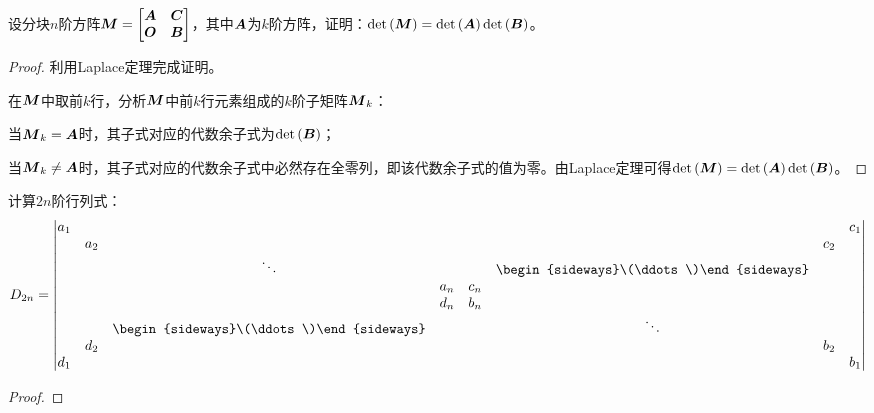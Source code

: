 \begin{problem}
设分块\(n\)阶方阵\(\boldsymbol{M}=\begin{bmatrix}\boldsymbol{A}&\boldsymbol{C}\\\boldsymbol{O}&\boldsymbol{B}\end{bmatrix}\)，其中\(\boldsymbol{A}\)为\(k\)阶方阵，证明：\(\mathrm{det}\left( \boldsymbol{M} \right)=\mathrm{det}\left( \boldsymbol{A} \right)\mathrm{det}\left( \boldsymbol{B} \right)\)。
\end{problem}
\begin{proof}
    利用Laplace定理完成证明。

    在\(\boldsymbol{M}\)中取前\(k\)行，分析\(\boldsymbol{M}\)中前\(k\)行元素组成的\(k\)阶子矩阵\(\boldsymbol{M}_k\)：

    当\(\boldsymbol{M}_k=\boldsymbol{A}\)时，其子式对应的代数余子式为\(\mathrm{det}\left( \boldsymbol{B} \right)\)；

    当\(\boldsymbol{M}_k\neq\boldsymbol{A}\)时，其子式对应的代数余子式中必然存在全零列，即该代数余子式的值为零。由Laplace定理可得\(\mathrm{det}\left( \boldsymbol{M} \right)=\mathrm{det}\left( \boldsymbol{A} \right)\mathrm{det}\left( \boldsymbol{B} \right)\)。
\end{proof}

\begin{problem}
计算\(2n\)阶行列式：
\begin{equation*}
    D_{2n}=
    \begin{vmatrix}
        a_1 &     &                                          &     &     &                                          &     & c_1 \\
            & a_2 &                                          &     &     &                                          & c_2 &     \\
            &     & \ddots                                   &     &     & \begin{sideways}\(\ddots\)\end{sideways} &     &     \\
            &     &                                          & a_n & c_n &                                          &     &     \\
            &     &                                          & d_n & b_n &                                          &     &     \\
            &     & \begin{sideways}\(\ddots\)\end{sideways} &     &     & \ddots                                   &     &     \\
            & d_2 &                                          &     &     &                                          & b_2 &     \\
        d_1 &     &                                          &     &     &                                          &     & b_1
    \end{vmatrix}
\end{equation*}
\end{problem}
\begin{proof}
\end{proof}


